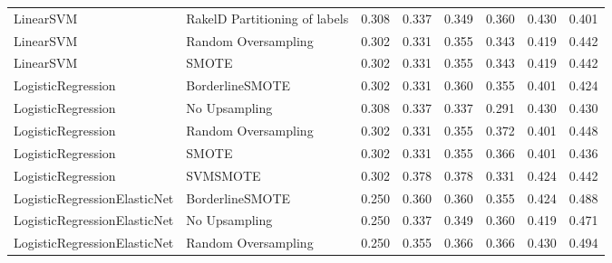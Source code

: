 \begin{tabular}{llllllll}
                      LinearSVM & RakelD Partitioning of labels & 0.308 &                     0.337 &                 0.349 &                  0.360 &                                   0.430 &    0.401 \\
                      LinearSVM &           Random Oversampling & 0.302 &                     0.331 &                 0.355 &                  0.343 &                                   0.419 &    0.442 \\
                      LinearSVM &                         SMOTE & 0.302 &                     0.331 &                 0.355 &                  0.343 &                                   0.419 &    0.442 \\
             LogisticRegression &               BorderlineSMOTE & 0.302 &                     0.331 &                 0.360 &                  0.355 &                                   0.401 &    0.424 \\
             LogisticRegression &                 No Upsampling & 0.308 &                     0.337 &                 0.337 &                  0.291 &                                   0.430 &    0.430 \\
             LogisticRegression &           Random Oversampling & 0.302 &                     0.331 &                 0.355 &                  0.372 &                                   0.401 &    0.448 \\
             LogisticRegression &                         SMOTE & 0.302 &                     0.331 &                 0.355 &                  0.366 &                                   0.401 &    0.436 \\
             LogisticRegression &                      SVMSMOTE & 0.302 &                     0.378 &                 0.378 &                  0.331 &                                   0.424 &    0.442 \\
   LogisticRegressionElasticNet &               BorderlineSMOTE & 0.250 &                     0.360 &                 0.360 &                  0.355 &                                   0.424 &    0.488 \\
   LogisticRegressionElasticNet &                 No Upsampling & 0.250 &                     0.337 &                 0.349 &                  0.360 &                                   0.419 &    0.471 \\
   LogisticRegressionElasticNet &           Random Oversampling & 0.250 &                     0.355 &                 0.366 &                  0.366 &                                   0.430 &    0.494 \\

\end{tabular}
